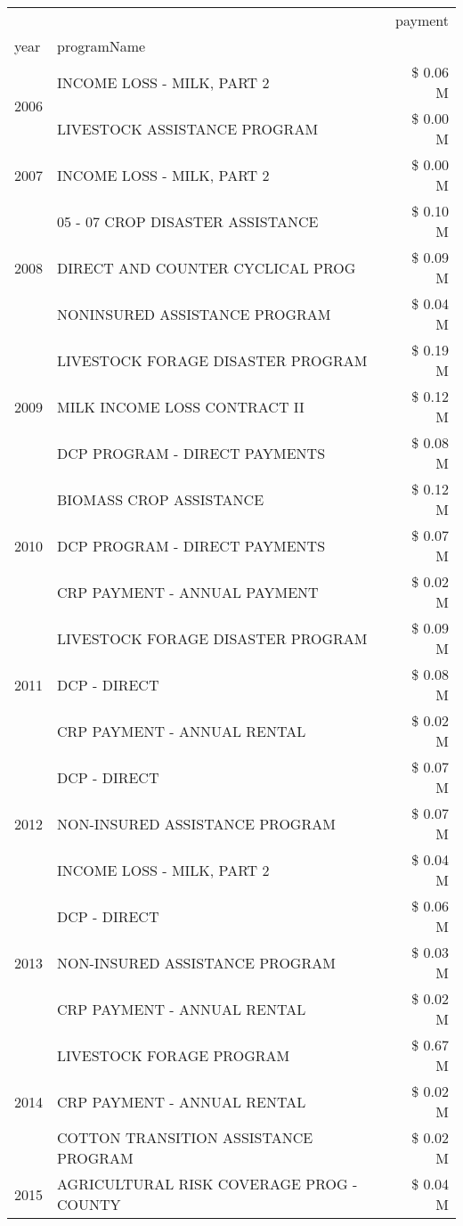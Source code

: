 \begin{tabular}{llr}
\toprule
 &  & payment \\
year & programName &  \\
\midrule
\multirow[t]{2}{*}{2006} & INCOME LOSS - MILK, PART 2 & \$ 0.06 M \\
 & LIVESTOCK ASSISTANCE PROGRAM & \$ 0.00 M \\
\cline{1-3}
2007 & INCOME LOSS - MILK, PART 2 & \$ 0.00 M \\
\cline{1-3}
\multirow[t]{3}{*}{2008} & 05 - 07 CROP DISASTER ASSISTANCE & \$ 0.10 M \\
 & DIRECT AND COUNTER CYCLICAL PROG & \$ 0.09 M \\
 & NONINSURED ASSISTANCE PROGRAM & \$ 0.04 M \\
\cline{1-3}
\multirow[t]{3}{*}{2009} & LIVESTOCK FORAGE DISASTER  PROGRAM & \$ 0.19 M \\
 & MILK INCOME LOSS CONTRACT II & \$ 0.12 M \\
 & DCP PROGRAM - DIRECT PAYMENTS & \$ 0.08 M \\
\cline{1-3}
\multirow[t]{3}{*}{2010} & BIOMASS CROP ASSISTANCE & \$ 0.12 M \\
 & DCP PROGRAM - DIRECT PAYMENTS & \$ 0.07 M \\
 & CRP PAYMENT - ANNUAL PAYMENT & \$ 0.02 M \\
\cline{1-3}
\multirow[t]{3}{*}{2011} & LIVESTOCK FORAGE DISASTER PROGRAM & \$ 0.09 M \\
 & DCP - DIRECT & \$ 0.08 M \\
 & CRP PAYMENT - ANNUAL RENTAL & \$ 0.02 M \\
\cline{1-3}
\multirow[t]{3}{*}{2012} & DCP - DIRECT & \$ 0.07 M \\
 & NON-INSURED ASSISTANCE PROGRAM & \$ 0.07 M \\
 & INCOME LOSS - MILK, PART 2 & \$ 0.04 M \\
\cline{1-3}
\multirow[t]{3}{*}{2013} & DCP - DIRECT & \$ 0.06 M \\
 & NON-INSURED ASSISTANCE PROGRAM & \$ 0.03 M \\
 & CRP PAYMENT - ANNUAL RENTAL & \$ 0.02 M \\
\cline{1-3}
\multirow[t]{3}{*}{2014} & LIVESTOCK FORAGE PROGRAM & \$ 0.67 M \\
 & CRP PAYMENT - ANNUAL RENTAL & \$ 0.02 M \\
 & COTTON TRANSITION ASSISTANCE PROGRAM & \$ 0.02 M \\
\cline{1-3}
\multirow[t]{3}{*}{2015} & AGRICULTURAL RISK COVERAGE PROG - COUNTY & \$ 0.04 M \\

\end{tabular}
